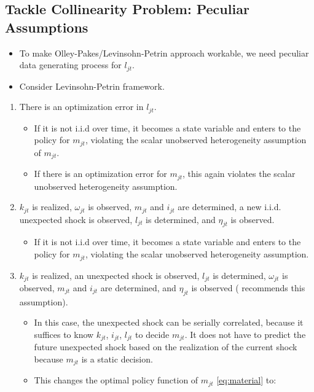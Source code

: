 \documentclass[]{book}
\providecommand{\tightlist}{%
  \setlength{\itemsep}{0pt}\setlength{\parskip}{0pt}}
\begin{document}
\subsection{Tackle Collinearity Problem: Peculiar
Assumptions}\label{tackle-collinearity-problem-peculiar-assumptions}

\begin{itemize}
\tightlist
\item
  To make Olley-Pakes/Levinsohn-Petrin approach workable, we need
  peculiar data generating process for \(l_{jt}\).
\item
  Consider Levinsohn-Petrin framework.
\end{itemize}

\begin{enumerate}
\def\labelenumi{\arabic{enumi}.}
\tightlist
\item
  There is an optimization error in \(l_{jt}\).

  \begin{itemize}
  \tightlist
  \item
    If it is not i.i.d over time, it becomes a state variable and enters
    to the policy for \(m_{jt}\), violating the scalar unobserved
    heterogeneity assumption of \(m_{jt}\).
  \item
    If there is an optimization error for \(m_{jt}\), this again
    violates the scalar unobserved heterogeneity assumption.
  \end{itemize}
\item
  \(k_{jt}\) is realized, \(\omega_{jt}\) is observed, \(m_{jt}\) and
  \(i_{jt}\) are determined, a new i.i.d. unexpected shock is observed,
  \(l_{jt}\) is determined, and \(\eta_{jt}\) is observed.

  \begin{itemize}
  \tightlist
  \item
    If it is not i.i.d over time, it becomes a state variable and enters
    to the policy for \(m_{jt}\), violating the scalar unobserved
    heterogeneity assumption.
  \end{itemize}
\item
  \(k_{jt}\) is realized, an unexpected shock is observed, \(l_{jt}\) is
  determined, \(\omega_{jt}\) is observed, \(m_{jt}\) and \(i_{jt}\) are
  determined, and \(\eta_{jt}\) is observed (\citet{Ackerberg2016}
  recommends this assumption).

  \begin{itemize}
  \tightlist
  \item
    In this case, the unexpected shock can be serially correlated,
    because it suffices to know \(k_{jt}\), \(i_{jt}\), \(l_{jt}\) to
    decide \(m_{jt}\). It does not have to predict the future unexpected
    shock based on the realization of the current shock because
    \(m_{jt}\) is a static decision.
  \item
    This changes the optimal policy function of \(m_{jt}\)
    \eqref{eq:material} to:


\end{itemize}
\end{enumerate}
\end{document}
